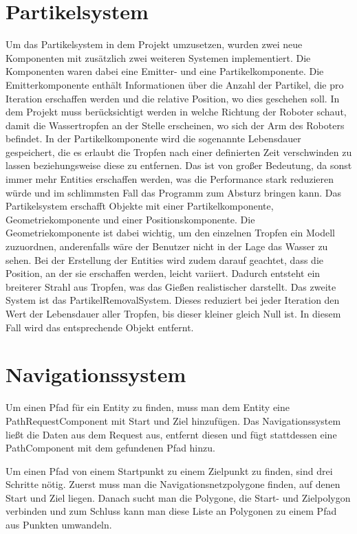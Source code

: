 \section{Partikelsystem}
Um das Partikelsystem in dem Projekt umzusetzen, wurden zwei neue Komponenten mit zusätzlich zwei weiteren Systemen implementiert. Die Komponenten waren dabei eine Emitter- und eine Partikelkomponente. Die Emitterkomponente enthält Informationen über die Anzahl der Partikel, die pro Iteration erschaffen werden und die relative Position, wo dies geschehen soll. In dem Projekt muss berücksichtigt werden in welche Richtung der Roboter schaut, damit die Wassertropfen an der Stelle erscheinen, wo sich der Arm des Roboters befindet. In der Partikelkomponente wird die sogenannte Lebensdauer gespeichert, die es erlaubt die Tropfen nach einer definierten Zeit verschwinden zu lassen beziehungsweise diese zu entfernen. Das ist von großer Bedeutung, da sonst immer mehr Entities erschaffen werden, was die Performance stark reduzieren würde und im schlimmsten Fall das Programm zum Absturz bringen kann. Das Partikelsystem erschafft Objekte mit einer Partikelkomponente, Geometriekomponente und einer Positionskomponente. Die Geometriekomponente ist dabei wichtig, um den einzelnen Tropfen ein Modell zuzuordnen, anderenfalls wäre der Benutzer nicht in der Lage das Wasser zu sehen. Bei der Erstellung der Entities wird zudem darauf geachtet, dass die Position, an der sie erschaffen werden, leicht variiert. Dadurch entsteht ein breiterer Strahl aus Tropfen, was das Gießen realistischer darstellt. Das zweite System ist das PartikelRemovalSystem. Dieses reduziert bei jeder Iteration den Wert der Lebensdauer aller Tropfen, bis dieser kleiner gleich Null ist. In diesem Fall wird das entsprechende Objekt entfernt. 
\section{Navigationssystem}

Um einen Pfad für ein Entity zu finden, muss man dem Entity eine PathRequestComponent mit Start und Ziel hinzufügen. Das Navigationssystem ließt die Daten aus dem Request aus, entfernt diesen und fügt stattdessen eine PathComponent mit dem gefundenen Pfad hinzu.

Um einen Pfad von einem Startpunkt zu einem Zielpunkt zu finden, sind drei Schritte nötig. Zuerst muss man die Navigationsnetzpolygone finden, auf denen Start und Ziel liegen. Danach sucht man die Polygone, die Start- und Zielpolygon verbinden und zum Schluss kann man diese Liste an Polygonen zu einem Pfad aus Punkten umwandeln.

